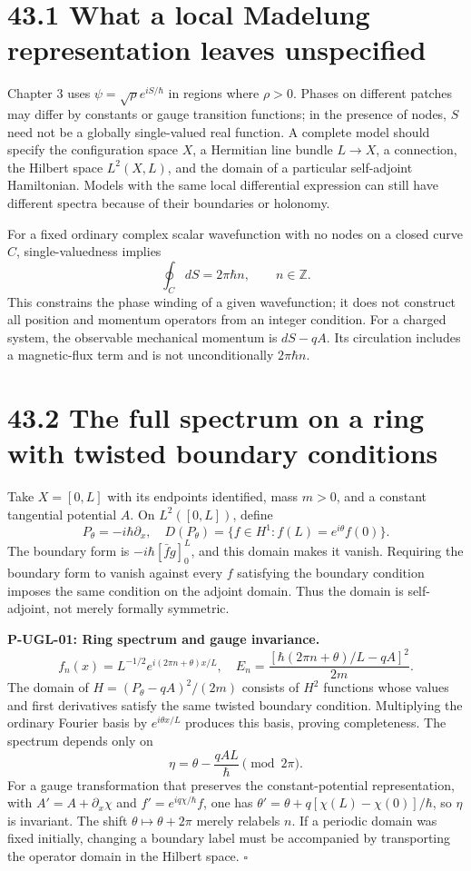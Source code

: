 \documentclass[
  11pt,
  oneside]{book}
\begin{document}
\section{43.1 What a local Madelung representation leaves unspecified}

Chapter 3 uses \(\psi=\sqrt\rho e^{iS/\hbar}\) in regions where
\(\rho>0\). Phases on different patches may differ by constants or gauge
transition functions; in the presence of nodes, \(S\) need not be a
globally single-valued real function. A complete model should specify
the configuration space \(X\), a Hermitian line bundle \(L\to X\), a
connection, the Hilbert space \(L^2(X,L)\), and the domain of a
particular self-adjoint Hamiltonian. Models with the same local
differential expression can still have different spectra because of
their boundaries or holonomy.

For a fixed ordinary complex scalar wavefunction with no nodes on a
closed curve \(C\), single-valuedness implies \[
\oint_C dS=2\pi\hbar n,\qquad n\in\mathbb Z.
\] This constrains the phase winding of a given wavefunction; it does
not construct all position and momentum operators from an integer
condition. For a charged system, the observable mechanical momentum is
\(dS-qA\). Its circulation includes a magnetic-flux term and is not
unconditionally \(2\pi\hbar n\).

\section{43.2 The full spectrum on a ring with twisted boundary
conditions}

Take \(X=[0,L]\) with its endpoints identified, mass \(m>0\), and a
constant tangential potential \(A\). On \(L^2([0,L])\), define \[
P_\theta=-i\hbar\partial_x,
\quad D(P_\theta)=\{f\in H^1:f(L)=e^{i\theta}f(0)\}.
\] The boundary form is \(-i\hbar[\bar f g]_0^L\), and this domain makes
it vanish. Requiring the boundary form to vanish against every \(f\)
satisfying the boundary condition imposes the same condition on the
adjoint domain. Thus the domain is self-adjoint, not merely formally
symmetric.

\label{p-ugl-01}{}

\textbf{P-UGL-01: Ring spectrum and gauge invariance.} \[
f_n(x)=L^{-1/2}e^{i(2\pi n+\theta)x/L},\quad
E_n=\frac{[\hbar(2\pi n+\theta)/L-qA]^2}{2m}.
\] The domain of \(H=(P_\theta-qA)^2/(2m)\) consists of \(H^2\)
functions whose values and first derivatives satisfy the same twisted
boundary condition. Multiplying the ordinary Fourier basis by
\(e^{i\theta x/L}\) produces this basis, proving completeness. The
spectrum depends only on \[
\eta=\theta-\frac{qAL}{\hbar}\pmod {2\pi}.
\] For a gauge transformation that preserves the constant-potential
representation, with \(A'=A+\partial_x\chi\) and
\(f'=e^{iq\chi/\hbar}f\), one has
\(\theta'=\theta+q[\chi(L)-\chi(0)]/\hbar\), so \(\eta\) is invariant.
The shift \(\theta\mapsto\theta+2\pi\) merely relabels \(n\). If a
periodic domain was fixed initially, changing a boundary label must be
accompanied by transporting the operator domain in the Hilbert space.
\(\square\)
\end{document}
